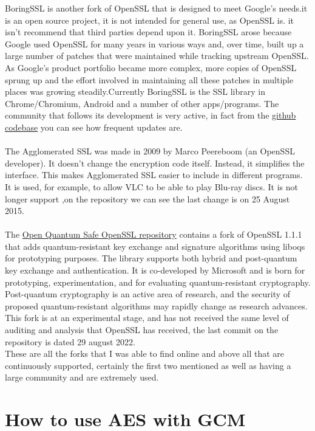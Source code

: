 \documentclass{article}
\begin{document}
BoringSSL is another fork of OpenSSL that is designed to meet Google's needs.it is an open source project, it is not intended for general use, as OpenSSL is. it isn't recommend that third parties depend upon it. BoringSSL arose because Google used OpenSSL for many years in various ways and, over time, built up a large number of patches that were maintained while tracking upstream OpenSSL. As Google's product portfolio became more complex, more copies of OpenSSL sprung up and the effort involved in maintaining all these patches in multiple places was growing steadily.Currently BoringSSL is the SSL library in Chrome/Chromium, Android and a number of other apps/programs. The community that follows its development is very active, in fact from the  \href{https://github.com/google/boringssl}{github codebase} you can see how frequent updates are.\\\\
The Agglomerated SSL was made in 2009 by Marco Peereboom (an OpenSSL developer). It doesn’t change the encryption code itself. Instead, it simplifies the interface. This makes Agglomerated SSL easier to include in different programs. It is used, for example, to allow VLC to be able to play Blu-ray discs. It is not longer support ,on the repository we can see the last change is on 25 August 2015.\\\\
The \href{https://github.com/open-quantum-safe/openssl/tree/OQS-OpenSSL_1_1_1-stable}{Open Quantum Safe OpenSSL repository} contains a fork of OpenSSL 1.1.1 that adds quantum-resistant key exchange and signature algorithms using liboqs for prototyping purposes. The library supports both hybrid and post-quantum key exchange and authentication. It is co-developed by Microsoft and is born for prototyping, experimentation, and for evaluating quantum-resistant cryptography. Post-quantum cryptography is an active area of research, and the security of proposed quantum-resistant algorithms may rapidly change as research advances. This fork is at an experimental stage, and has not received the same level of auditing and analysis that OpenSSL has received, the last commit on the repository is dated 29 august 2022.\\
These are all the forks that I was able to find online and above all that are continuously supported, certainly the first two mentioned as well as having a large community and are extremely used.


\section{How to use AES with GCM}
\end{document}
